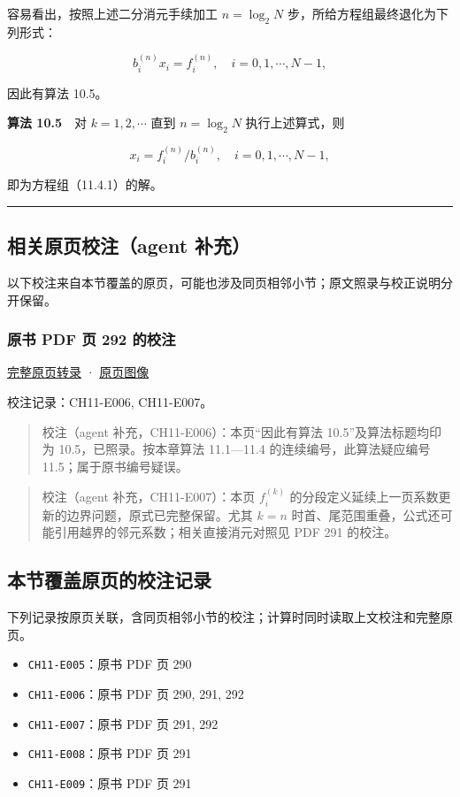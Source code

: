 \documentclass[
  10pt,
  fontset=fandol]{ctexart}
\providecommand{\tightlist}{%
  \setlength{\itemsep}{0pt}\setlength{\parskip}{0pt}}
\begin{document}
容易看出，按照上述二分消元手续加工 \(n=\log_2 N\) 步，所给方程组最终退化为下列形式：

\[
b_i^{(n)}x_i=f_i^{(n)},\quad i=0,1,\cdots,N-1,
\]

因此有算法 10.5。

\textbf{算法 10.5}　对 \(k=1,2,\cdots\) 直到 \(n=\log_2 N\) 执行上述算式，则

\[
x_i=f_i^{(n)}/b_i^{(n)},\quad i=0,1,\cdots,N-1,
\]

即为方程组（11.4.1）的解。

\begin{center}\rule{0.5\linewidth}{0.5pt}\end{center}

\subsection{相关原页校注（agent 补充）}\label{ux76f8ux5173ux539fux9875ux6821ux6ce8agent-ux8865ux5145}

以下校注来自本节覆盖的原页，可能也涉及同页相邻小节；原文照录与校正说明分开保留。

\subsubsection{原书 PDF 页 292 的校注}\label{ux539fux4e66-pdf-ux9875-292-ux7684ux6821ux6ce8}

\href{../pages/pdf-292.md}{完整原页转录} · \href{../../source-images/pdf-292.jpeg}{原页图像}

校注记录：CH11-E006, CH11-E007。

\begin{quote}
校注（agent 补充，CH11-E006）：本页``因此有算法 10.5''及算法标题均印为 10.5，已照录。按本章算法 11.1---11.4 的连续编号，此算法疑应编号 11.5；属于原书编号疑误。
\end{quote}

\begin{quote}
校注（agent 补充，CH11-E007）：本页 \(f_i^{(k)}\) 的分段定义延续上一页系数更新的边界问题，原式已完整保留。尤其 \(k=n\) 时首、尾范围重叠，公式还可能引用越界的邻元系数；相关直接消元对照见 PDF 291 的校注。
\end{quote}

\subsection{本节覆盖原页的校注记录}\label{ux672cux8282ux8986ux76d6ux539fux9875ux7684ux6821ux6ce8ux8bb0ux5f55}

下列记录按原页关联，含同页相邻小节的校注；计算时同时读取上文校注和完整原页。

\begin{itemize}
\tightlist
\item
  \texttt{CH11-E005}：原书 PDF 页 290
\item
  \texttt{CH11-E006}：原书 PDF 页 290, 291, 292
\item
  \texttt{CH11-E007}：原书 PDF 页 291, 292
\item
  \texttt{CH11-E008}：原书 PDF 页 291
\item
  \texttt{CH11-E009}：原书 PDF 页 291
\end{itemize}
\end{document}
